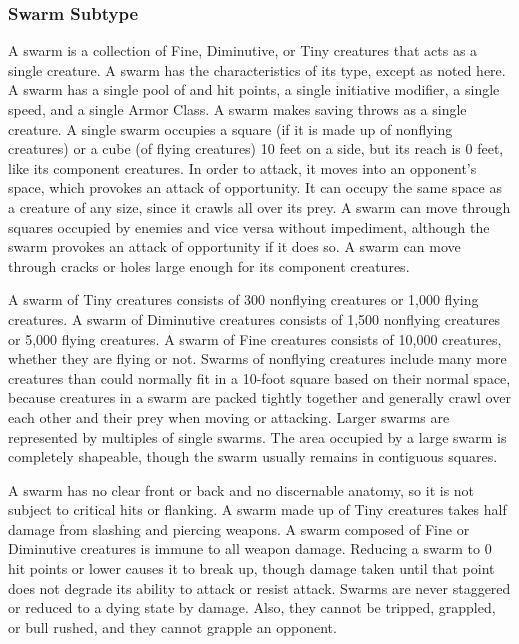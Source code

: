 \subsubsection{Swarm Subtype} A swarm is a collection of Fine, Diminutive, or Tiny creatures that acts as a single creature. A swarm has the characteristics of its type, except as noted here. A swarm has a single pool of  and hit points, a single initiative modifier, a single speed, and a single Armor Class. A swarm makes saving throws as a single creature. A single swarm occupies a square (if it is made up of nonflying creatures) or a cube (of flying creatures) 10 feet on a side, but its reach is 0 feet, like its component creatures. In order to attack, it moves into an opponent's space, which provokes an attack of opportunity. It can occupy the same space as a creature of any size, since it crawls all over its prey. A swarm can move through squares occupied by enemies and vice versa without impediment, although the swarm provokes an attack of opportunity if it does so. A swarm can move through cracks or holes large enough for its component creatures.

A swarm of Tiny creatures consists of 300 nonflying creatures or 1,000 flying creatures. A swarm of Diminutive creatures consists of 1,500 nonflying creatures or 5,000 flying creatures. A swarm of Fine creatures consists of 10,000 creatures, whether they are flying or not. Swarms of nonflying creatures include many more creatures than could normally fit in a 10-foot square based on their normal space, because creatures in a swarm are packed tightly together and generally crawl over each other and their prey when moving or attacking. Larger swarms are represented by multiples of single swarms. The area occupied by a large swarm is completely shapeable, though the swarm usually remains in contiguous squares.

 A swarm has no clear front or back and no discernable anatomy, so it is not subject to critical hits or flanking. A swarm made up of Tiny creatures takes half damage from slashing and piercing weapons. A swarm composed of Fine or Diminutive creatures is immune to all weapon damage. Reducing a swarm to 0 hit points or lower causes it to break up, though damage taken until that point does not degrade its ability to attack or resist attack. Swarms are never staggered or reduced to a dying state by damage. Also, they cannot be tripped, grappled, or bull rushed, and they cannot grapple an opponent.

